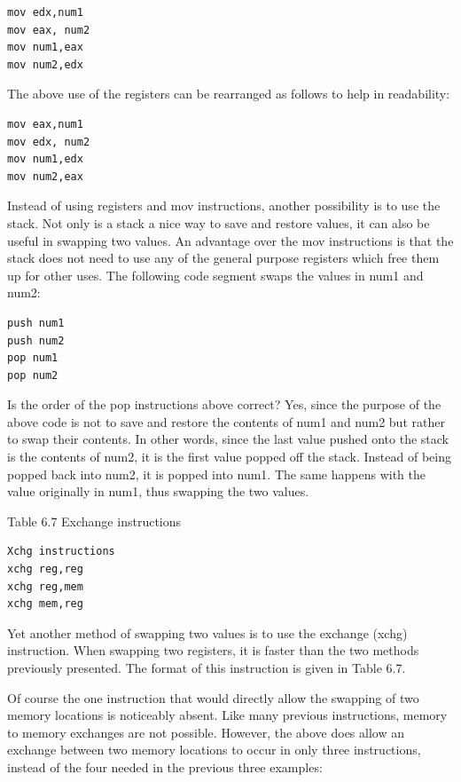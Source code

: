 \documentclass[10pt]{article}
\begin{document}
\begin{verbatim}
mov edx,num1
mov eax, num2
mov num1,eax
mov num2,edx
\end{verbatim}

The above use of the registers can be rearranged as follows to help in readability:

\begin{verbatim}
mov eax,num1
mov edx, num2
mov num1,edx
mov num2,eax
\end{verbatim}

Instead of using registers and mov instructions, another possibility is to use the stack. Not only is a stack a nice way to save and restore values, it can also be useful in swapping two values. An advantage over the mov instructions is that the stack does not need to use any of the general purpose registers which free them up for other uses. The following code segment swaps the values in num1 and num2:

\begin{verbatim}
push num1
push num2
pop num1
pop num2
\end{verbatim}

Is the order of the pop instructions above correct? Yes, since the purpose of the above code is not to save and restore the contents of num1 and num2 but rather to swap their contents. In other words, since the last value pushed onto the stack is the contents of num2, it is the first value popped off the stack. Instead of being popped back into num2, it is popped into num1. The same happens with the value originally in num1, thus swapping the two values.

Table 6.7 Exchange instructions

\begin{verbatim}
Xchg instructions
xchg reg,reg
xchg reg,mem
xchg mem,reg
\end{verbatim}

Yet another method of swapping two values is to use the exchange (xchg) instruction. When swapping two registers, it is faster than the two methods previously presented. The format of this instruction is given in Table 6.7.

Of course the one instruction that would directly allow the swapping of two memory locations is noticeably absent. Like many previous instructions, memory to memory exchanges are not possible. However, the above does allow an exchange between two memory locations to occur in only three instructions, instead of the four needed in the previous three examples:
\end{document}
